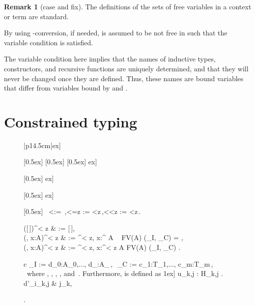 \documentclass{LMCS}
\theoremstyle{plain}
\theoremstyle{definition}
\newtheorem{remm}[thm]{Remark}
\def\calf{\mathcal{F}}
\def\calp{\mathcal{P}}
\def\calw{\mathcal{W}}
\def\consc{\textbf{c}}
\def\consd{\textbf{d}}
\def\De{\Delta}
\def\Ga{\Gamma}
\def\la{\lambda}
\newcommand{\edash}{\vdash}
\newcommand{\dom}{{\mathrm d}{\mathrm o}{\mathrm m}}
\newcommand{\rbm}[1]{\raisebox{-1.5ex}[0.5ex]{}}
\def\bs{\backslash}
\def\wf{\calw\calf}
\def\sma#1{<\!\!\!#1}
\def\equ#1{=\!\!\!#1}
\begin{document}
\begin{remm}[\textsf{case} and \textsf{fix}]
The definitions of the sets of free variables in a context or term are standard. 

 By using -conversion, if needed,  is assumed to be not free in  such that the variable condition is satisfied.

\noindent  The variable condition here implies that the names of inductive types, constructors, and recursive functions are uniquely determined, and that they will never be changed once they are defined. Thus, these names are bound variables that differ from variables bound by  and .


\section{Constrained typing}\label{constraint}
\begin{figure}[t]
\begin{center}
\noindent \begin{tabular}{|p{14.5cm}|}\hline \4ex]

\hfill \rbm{ \infer{ \wf(\Ga, x:^\consc M)}
{\Ga\edash M: s } } 
 \hfill
\rbm{ \infer{ \Ga\edash x:^\consc A} 
  {\wf(\Ga) & x:^\consc A\in\Ga } }
\hfill \rbm{ \infer{ \Ga\edash t:^\epsilon A} 
  {\Ga\edash t:^\consc A } }
 \hfill \4ex]
 
 \hfill \rbm{\infer{\Ga\edash \Pi x:^\consc A.B= \Pi x:^\consc A'.B':^\epsilon s_3}
   {\Ga\edash A= A':^\epsilon s_1 & \Ga,x:^\consc A\edash B= B':^\epsilon s_2 & \calp(s_1,s_2,s_3)} }
\hfill \7ex]

\hfill \rbm{\infer{\Ga\edash \la x:^\consc A.M = \la x:^\consc A'.M':^\consd \Pi x:^\consc A.B}
  {\deduce{\Ga, x:^\consc A\edash M= M':^\consd B}
    {\Ga\edash A= A':^\epsilon s_1 & \Ga,x:^\consc A\edash B:^\epsilon s_2} } }
\hfill \4ex] 

 \hfill \rbm{\infer{\Ga\edash MN= M'N':^\consd B[x\bs N]}
   {\Ga\edash M= M':^\consd\Pi x:^\consc A.B & \Ga\edash N= N:^\consc A} }
\hfill \
  <\epsilon := \epsilon\,,\qquad <\equ z := \sma z\,,\qquad <\sma z  := \sma z\,.

([\,])^{<\! z} & := [\,], \\
(\De, x:A)^{<\! z} & := \De^{<\! z}, x:^{\epsilon} A \quad\,\,\,  FV(A) \cap \dom(\De_I, \De_C) = \varnothing, \\
(\De, x:A)^{<\! z} & := \De^{<\! z}, x:^{<\! z} A \quad {} FV(A) \cap \dom(\De_I, \De_C) \neq \varnothing.

\begin{array}{c}
  \De_I := d_0:A_0,..., d_\ell:A_\ell\,,\,\,
  \De_C := c_1:T_1,..., c_m:T_m\,, \
where ,
,
,  
, and 
\,. 
Furthermore,  is defined as
1ex]
           \Pi \vec u_{k,j} : \vec H_{k,j} .\, d'_{i_{k,j}} & j\in\nu_k,
         \end{array}\right .


\end{tabular}
\end{center}
\end{figure}
\end{remm}
\end{document}
